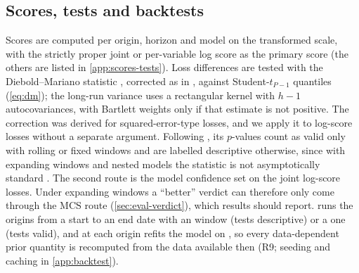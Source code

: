 \subsection{Scores, tests and backtests}\label{sec:eval-scores}\label{sec:eval-tests}\label{sec:eval-backtest}

Scores are computed per origin, horizon and model on the transformed scale, with the strictly
proper \citep{gneiting2007strictly} joint or per-variable log score as the primary score (the
others are listed in \cref{app:scores-tests}).
Loss differences are tested with the Diebold--Mariano statistic \citep{diebold1995comparing},
corrected as in \citet{harvey1997testing}, against Student-$t_{P-1}$ quantiles (\cref{eq:dm}); the
long-run variance uses a rectangular kernel with $h - 1$ autocovariances, with Bartlett weights
only if that estimate is not positive. The correction was derived for squared-error-type losses, and
we apply it to log-score losses without a separate argument.
Following \citet{giacomini2006tests}, its $p$-values count as valid only with rolling or fixed
windows and are labelled descriptive otherwise, since with expanding windows and nested models the
statistic is not asymptotically standard \citep{clark2001tests}.
The second route is the model confidence set \citep{hansen2011model} on the joint log-score
losses.
Under expanding windows a ``better'' verdict can therefore only come through the MCS route
(\cref{sec:eval-verdict}), which results should report.
 runs the origins from a start to an end date with an  window
(tests descriptive) or a  one (tests valid), and at each origin refits the model on
, so every data-dependent prior quantity is recomputed from
the data available then (R9; seeding and caching in \cref{app:backtest}).

